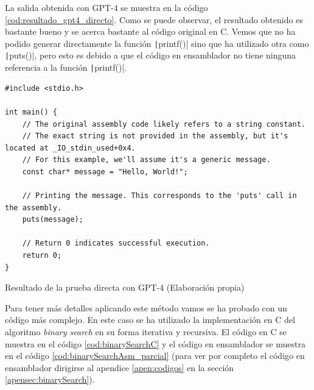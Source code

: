 La salida obtenida con GPT-4 se muestra en la código \ref{cod:resultado_gpt4_directo}. Como se puede
observar, el resultado obtenido es bastante bueno y se acerca bastante al código original en C. Vemos
que no ha podido generar directamente la función \texttt|printf()| sino que ha utilizado
otra como \texttt|puts()|, pero esto es debido a que el código en ensamblador no tiene
ninguna referencia a la función \texttt|printf()|.

\begin{mycode}
    \begin{verbatim}
#include <stdio.h>

int main() {
    // The original assembly code likely refers to a string constant.
    // The exact string is not provided in the assembly, but it's located at _IO_stdin_used+0x4.
    // For this example, we'll assume it's a generic message.
    const char* message = "Hello, World!";

    // Printing the message. This corresponds to the 'puts' call in the assembly.
    puts(message);

    // Return 0 indicates successful execution.
    return 0;
}
    \end{verbatim}
    \caption[Resultado de la prueba directa con GPT-4]{Resultado de la prueba directa con GPT-4 (Elaboración propia)}
    \label{cod:resultado_gpt4_directo}
\end{mycode}

Para tener más detalles aplicando este método vamos se ha probado con un código más complejo.
En este caso se ha utilizado la implementación en C del algoritmo \textit{binary search} en
su forma iterativa y recursiva. El código en C se muestra en el código \ref{cod:binarySearchC}
y el código en ensamblador se muestra en el código \ref{cod:binarySearchAsm_parcial} (para ver
por completo el código en ensamblador dirigirse al apendice \ref{apen:codigos} en la sección
\ref{apensec:binarySearch}).

